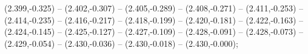 (2.399,-0.325) -- (2.402,-0.307) -- (2.405,-0.289) -- (2.408,-0.271) -- (2.411,-0.253) -- (2.414,-0.235) -- (2.416,-0.217) -- (2.418,-0.199) -- (2.420,-0.181) -- (2.422,-0.163) -- (2.424,-0.145) -- (2.425,-0.127) -- (2.427,-0.109) -- (2.428,-0.091) -- (2.428,-0.073) -- (2.429,-0.054) -- (2.430,-0.036) -- (2.430,-0.018) -- (2.430,-0.000);
